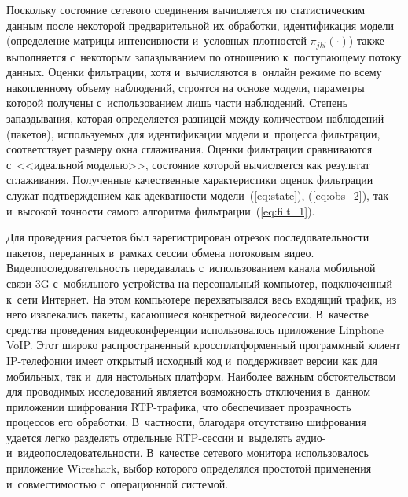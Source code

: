 \begin{multicols}{2}
Поскольку состояние сетевого соединения вычисляет\-ся по
статистическим данным после неко\-торой предварительной их обработки,
идентификация модели (определение матрицы ин\-тен\-сив\-ности и~условных
плотностей $\pi_{jkl}(\cdot)$) также выполняется с~некоторым
запаздыванием по отношению к~поступающему потоку данных. Оценки
фильт\-ра\-ции, хотя и~вычисляются в~онлайн режиме по всему накопленному
объему наблюдений, строятся на основе модели, параметры которой
получены с~использованием лишь части наблюдений. Степень
запаздывания, которая определяется разницей между количеством
наблюдений (пакетов), используемых для идентификации модели 
и~процесса фильтрации, соответствует размеру окна сглаживания. Оценки
фильтрации сравниваются с~<<идеальной моделью>>, состояние которой
вычисляется как результат сглаживания. Полученные качественные
характеристики оценок фильтрации служат подтверждением как
адекватности модели~(\ref{eq:state}), (\ref{eq:obs_2}), так 
и~высокой точности самого алгоритма фильтрации~(\ref{eq:filt_1}).


Для проведения расчетов был зарегистрирован отрезок
последовательности пакетов, переданных в~рамках сессии обмена
потоковым видео. Видеопоследовательность передавалась 
с~использованием канала мобильной связи 3G с~мобильного устройства на
персональный компьютер, подключенный к~сети Интернет. На этом
компьютере перехватывался весь входящий трафик, из него извлекались
пакеты, касающиеся конкретной видеосессии. В~качестве средства
проведения видеоконференции использовалось приложение Linphone VoIP.
Этот широко распространенный кроссплатформенный программный клиент
IP-те\-ле\-фо\-нии имеет открытый исходный код и~поддерживает версии как
для мобильных, так и~для настольных платформ. Наиболее важным
обстоятельством для проводимых исследований является возможность
отключения в~данном приложении шифрования RTP-тра\-фи\-ка, %
что
обеспечивает прозрачность процессов его обработки. В~част\-ности,
благодаря отсутствию шиф\-ро\-ва\-ния удается легко разделять отдельные
\mbox{RTP-сес}\-сии и~выделять аудио- и~видеопоследовательности. В~качестве
сетевого монитора использовалось приложение Wireshark, выбор
которого определялся простотой применения и~совместимостью с~операционной системой.
\begin{figure*} %
\vspace*{1pt}
 \begin{center}
 \mbox{%
 \epsfxsize=144.076mm
 }
 \end{center}
 \vspace*{-9pt}
\end{figure*}




\end{multicols}
